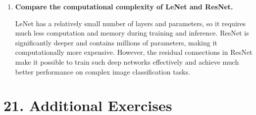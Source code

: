 \documentclass[11pt]{article}
\begin{document}
\begin{enumerate}
Pretrained models converge faster because they do not start with completely random weights. They have already learned useful visual features such as edges, textures, shapes, and patterns from a large dataset. Therefore, when the model is trained on a new dataset, it only needs to adjust these existing features rather than learning everything from the beginning.
\vspace{5mm}
\item \textbf{Compare the computational complexity of LeNet and ResNet.}

LeNet has a relatively small number of layers and parameters, so it requires much less computation and memory during training and inference. ResNet is significantly deeper and contains millions of parameters, making it computationally more expensive. However, the residual connections in ResNet make it possible to train such deep networks effectively and achieve much better performance on complex image classification tasks.
\vspace{5mm}
\end{enumerate}

\section*{21. Additional Exercises}
\end{document}
